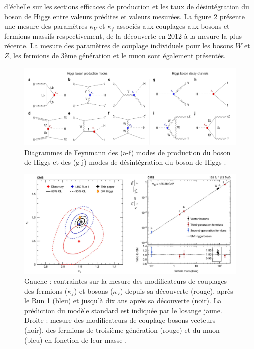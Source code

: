 d'échelle sur les sections efficaces de production et les taux de désintégration du boson de Higgs entre valeurs prédites et valeurs mesurées. La figure \ref{Cmodifiers} présente une mesure des paramètres $\kappa_{V}$ et $\kappa_f$ associés aux couplages aux bosons et fermions massifs respectivement, de la découverte en 2012 à la mesure la plus récente. La mesure des paramètres de couplage individuels pour les bosons $W$ et $Z$, les fermions de 3ème génération et le muon sont également présentés.

\begin{figure}
\centering
    \includegraphics[scale=0.4]{Chapitre5/Images/Hdecays.png} 
    \caption{Diagrammes de Feynmann des (a-f) modes de production du boson de Higgs et des (g-j) modes de désintégration du boson de Higgs \cite{higgs10years}.}
    \label{Hdecays}
\end{figure}

\begin{figure}
\centering
    \includegraphics[scale=0.25]{Chapitre5/Images/Cmodifiers.png} 
    \caption{Gauche : contraintes sur la mesure des modificateurs de couplages des fermions ($\kappa_f$) et bosons ($\kappa_V$) depuis sa découverte (rouge), après le Run 1 (bleu) et jusqu'à dix ans après sa découverte (noir). La prédiction du modèle standard est indiquée par le losange jaune. Droite : mesure des modificateurs de couplage bosons vecteurs (noir), des fermions de troisième génération (rouge) et du muon (bleu) en fonction de leur masse \cite{higgs10years}.}
    \label{Cmodifiers}
\end{figure}



